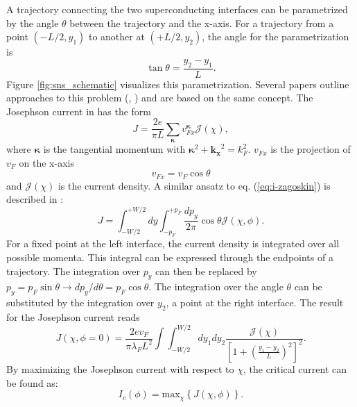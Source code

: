 A trajectory connecting the two superconducting interfaces can be parametrized by the angle $\theta$ between the trajectory and the x-axis. For a trajectory from a point $(-L/2, y_1)$ to another at $(+L/2, y_2)$, the angle for the parametrization is
\begin{equation}
\tan \theta = \frac{y_2 - y_1}{L}.
\label{eq:parametrization}
\end{equation}
Figure \ref{fig:sns_schematic} visualizes this parametrization. 
Several papers outline approaches to this problem (\cite{Zagoskin1997}, \cite{Barzykin1999}) and are based on the same concept. The Josephson current in \cite{Zagoskin1997} has the form
\begin{equation}
J =  \frac{2 e }{\pi L} \sum_{\bm{\kappa}}v^{\bm{\kappa}}_{Fx} \mathcal{J} \left(\chi\right), \label{eq:i-zagoskin}
\end{equation}
where $\bm{\kappa}$ is the tangential momentum with $\bm{\kappa}^2 + \mathbf{k_x}^2 = k_F^2$.
$v_{Fx}$ is the projection of $v_F$ on the x-axis
\begin{equation}
v_{Fx} =  v_F  \cos \theta
\end{equation}
and $\mathcal{J} \left( \chi \right)$ is the current density. A similar ansatz to eq. (\ref{eq:i-zagoskin}) is described in \cite{Meier2016}:
\begin{equation}
J =  \int_{-W/2}^{+W/2} dy \int_{-p_F}^{+p_F} \frac{dp_y}{2 \pi} \cos \theta \mathcal{J} \left( \chi, \phi \right).
\end{equation}
For a fixed point at the left interface, the current density is integrated over all possible momenta. This integral can be expressed through the endpoints of a trajectory. The integration over $p_y$ can then be replaced by $p_y = p_F \sin \theta \rightarrow d p_y/d\theta = p_F \cos \theta$. The integration over the angle $\theta$ can be substituted by the integration over $y_2$, a point at the right interface. The result for the Josephson current reads
\begin{equation}
J\left(\chi, \phi=0\right) = \frac{2 e v_F}{\pi \lambda_F L^2}  \int \int_{-W/2}^{W/2} d y_1 d y_2 \frac{\mathcal{J}(\chi)}{\left[ 1 + \left(\frac{y_1 - y_2}{L}\right)^2\right]^2}.
\label{eq:josephson_current_zero_b}
\end{equation}
By maximizing the Josephson current with respect to $\chi$, the critical current can be found as:
\begin{equation}
I_c(\phi) = \text{max}_{\chi}\left\{ J(\chi, \phi) \right\}\label{eq:josephson-relation}.
\end{equation}
